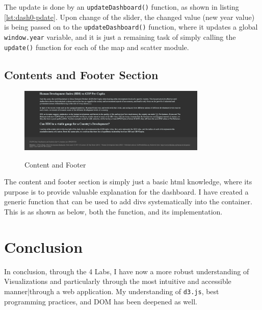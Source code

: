 \documentclass{scrreprt}
\begin{document}

The update is done by an \verb|updateDashboard()| function, as shown in listing \ref{lst:dash0-pdate}. Upon change of the slider, the changed value (new year value) is being passed on to the \verb|updateDashboard()| function, where it updates a global \verb|window.year| variable, and it is just a remaining task of simply calling the \verb|update()| function for each of the map and scatter module. 

\section{Contents and Footer Section}
\begin{figure}[H]
    \centering
    \includegraphics[width = 0.8\textwidth]{images/content.png}
    \label{fig:content}
    \caption{Content and Footer}
\end{figure}
The content and footer section is simply just a basic html knowledge, where its purpose is to provide valuable explanation for the dashboard. I have created a generic function that can be used to add divs systematically into the container. This is as shown as below, both the function, and its implementation.


\chapter{Conclusion}
In conclusion, through the 4 Labs, I have now a more robust understanding of Visualizations and particularly through the most intuitive and accessible manner|through a web application. My understanding of \verb|d3.js|, best programming practices, and DOM has been deepened as well.
\end{document}
